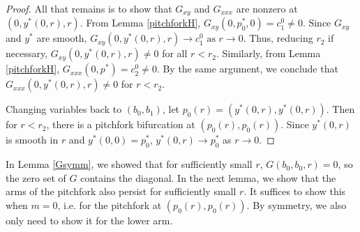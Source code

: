 \documentclass[thesis.tex]{subfiles}
\begin{document}
\begin{lemma}
\begin{proof}
All that remains is to show that $G_{xy}$ and $G_{xxx}$ are nonzero at $(0, y^*(0, r), r)$. From Lemma \ref{pitchforkH}, $G_{xy}(0, p_0^*, 0) = c_1^0 \neq 0$. Since $G_{xy}$ and $y^*$ are smooth, $G_{xy}(0, y^*(0, r), r) \rightarrow c_1^0 \text{ as } r \rightarrow 0$. Thus, reducing $r_2$ if necessary, $G_{xy}(0, y^*(0, r), r) \neq 0$ for all $r < r_2$. Similarly, from Lemma \ref{pitchforkH}, $G_{xxx}(0, p^*) = c_2^0 \neq 0$. By the same argument, we conclude that $G_{xxx}(0, y^*(0, r), r) \neq 0$ for $r < r_2$.

Changing variables back to $(b_0, b_1)$, let $p_0(r) = (y^*(0, r), y^*(0, r))$. Then for $r < r_2$, there is a pitchfork bifurcation at $(p_0(r), p_0(r))$. Since $y^*(0, r)$ is smooth in $r$ and $y^*(0, 0) = p_0^*$, $y^*(0, r) \rightarrow p_0^*$ as $r \rightarrow 0$.
\end{proof} 
\end{lemma}

In Lemma \ref{Gsymm}, we showed that for sufficiently small $r$, $G(b_0, b_0, r) = 0$, so the zero set of $G$ contains the diagonal. In the next lemma, we show that the arms of the pitchfork also persist for sufficiently small $r$. It suffices to show this when $m = 0$, i.e. for the pitchfork at $(p_0(r), p_0(r))$. By symmetry, we also only need to show it for the lower arm. 
\end{document}
